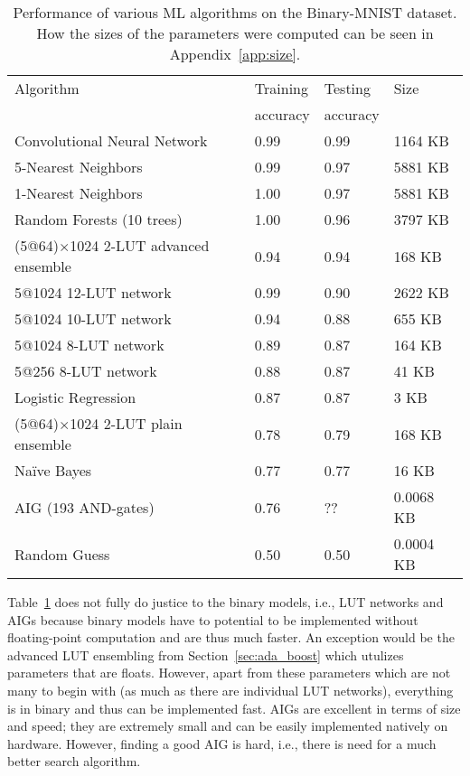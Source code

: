 \begin{table}[!htb]
    \begin{small}
        \begin{tabular}{llll}
        Algorithm & Training    & Testing    & Size               \\
                  & accuracy    & accuracy   &                    \\ \hline
        Convolutional Neural Network & 0.99  & 0.99 & 1164 KB     \\
        5-Nearest Neighbors          & 0.99  & 0.97 & 5881 KB     \\
        1-Nearest Neighbors          & 1.00  & 0.97 & 5881 KB     \\
        Random Forests (10 trees)    & 1.00  & 0.96 & 3797 KB     \\
        (5@64)$\times$1024 2-LUT advanced ensemble    & 0.94  & 0.94 & 168 KB      \\
        5@1024 12-LUT network        & 0.99  & 0.90 & 2622 KB     \\
        5@1024 10-LUT network        & 0.94  & 0.88 & 655 KB      \\
        5@1024 8-LUT network         & 0.89  & 0.87 & 164 KB      \\
        5@256 8-LUT network          & 0.88  & 0.87 & 41 KB       \\
        Logistic Regression          & 0.87  & 0.87 & 3 KB        \\
        (5@64)$\times$1024 2-LUT plain ensemble     & 0.78  & 0.79 & 168 KB      \\
        Naïve Bayes                  & 0.77  & 0.77 & 16 KB       \\
        AIG (193 AND-gates)          & 0.76  & ??   & 0.0068 KB   \\
        Random Guess                 & 0.50  & 0.50 & 0.0004 KB
        \end{tabular}
    \end{small}
    \caption{Performance of various ML algorithms on the Binary-MNIST dataset. How the sizes of the parameters were computed can be seen in Appendix~\ref{app:size}. }
\label{tab:ml_algos_on_bmnist}
\end{table}

\noindent Table~\ref{tab:ml_algos_on_bmnist} does not fully do justice to the binary models, i.e., LUT networks and AIGs because binary models have to potential to be implemented without floating-point computation and are thus much faster. An exception would be the advanced LUT ensembling from Section~\ref{sec:ada_boost} which utulizes parameters that are floats. However, apart from these parameters which are not many to begin with (as much as there are individual LUT networks), everything is in binary and thus can be implemented fast. AIGs are excellent in terms of size and speed; they are extremely small and can be easily implemented natively on hardware. However, finding a good AIG is hard, i.e., there is need for a much better search algorithm.

